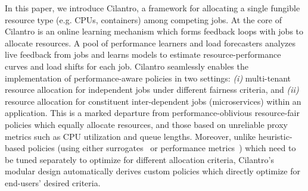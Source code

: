 


In this paper, we introduce Cilantro, a framework for allocating a single fungible resource type
(e.g. CPUs, containers) among competing jobs.
At the core of Cilantro is an online
learning mechanism which forms feedback loops with jobs
to allocate resources.
A pool of performance learners and load forecasters analyzes live feedback from jobs and
learns models to estimate
resource-performance curves and load shifts for each job.
% 
Cilantro seamlessly enables the implementation of performance-aware policies in two settings:
\emph{(i)} multi-tenant resource allocation for independent jobs under different fairness criteria,
and
\emph{(ii)} resource allocation for constituent inter-dependent jobs (microservices) within an
application.
This is a marked departure from performance-oblivious resource-fair policies
which equally allocate resources, and those based on
unreliable proxy metrics such as CPU utilization and queue lengths.
Moreover, unlike heuristic-based policies
(using either surrogates~\citep{rzadca2020autopilot}
or performance metrics~\citep{chen2019parties,jockey})
which need to be tuned separately to optimize for
different allocation criteria, Cilantro's modular design automatically derives custom
policies which directly optimize for end-users' desired criteria. 



